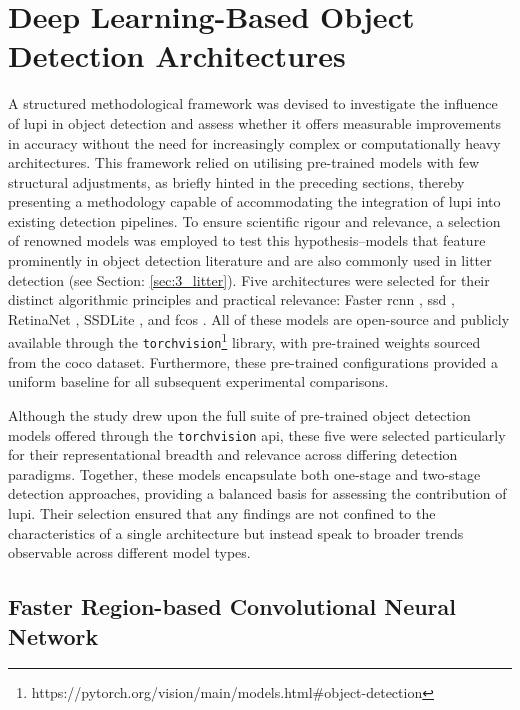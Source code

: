 \section{Deep Learning-Based Object Detection Architectures}
\label{sec:4_distillation_architectures}

A structured methodological framework was devised to investigate the influence of \gls{lupi} in object detection and assess whether it offers measurable improvements in accuracy without the need for increasingly complex or computationally heavy architectures. This framework relied on utilising pre-trained models with few structural adjustments, as briefly hinted in the preceding sections, thereby presenting a methodology capable of accommodating the integration of \gls{lupi} into existing detection pipelines.
To ensure scientific rigour and relevance, a selection of renowned models was employed to test this hypothesis--models that feature prominently in object detection literature and are also commonly used in litter detection (see Section: \ref{sec:3_litter}). Five architectures were selected for their distinct algorithmic principles and practical relevance: Faster \gls{rcnn} \cite{rcnn}, \gls{ssd} \cite{ssd}, RetinaNet \cite{retinanet}, SSDLite \cite{ssdlite}, and \gls{fcos} \cite{fcos}. All of these models are open-source and publicly available through the \verb|torchvision|\footnote{https://pytorch.org/vision/main/models.html\#object-detection} library, with pre-trained weights sourced from the \gls{coco} dataset. Furthermore, these pre-trained configurations provided a uniform baseline for all subsequent experimental comparisons.

Although the study drew upon the full suite of pre-trained object detection models offered through the \verb|torchvision| \gls{api}, these five were selected particularly for their representational breadth and relevance across differing detection paradigms. Together, these models encapsulate both one-stage and two-stage detection approaches, providing a balanced basis for assessing the contribution of \gls{lupi}. Their selection ensured that any findings are not confined to the characteristics of a single architecture but instead speak to broader trends observable across different model types.

\subsection{Faster Region-based Convolutional Neural Network}
\label{subsec:4_fastercnn}


